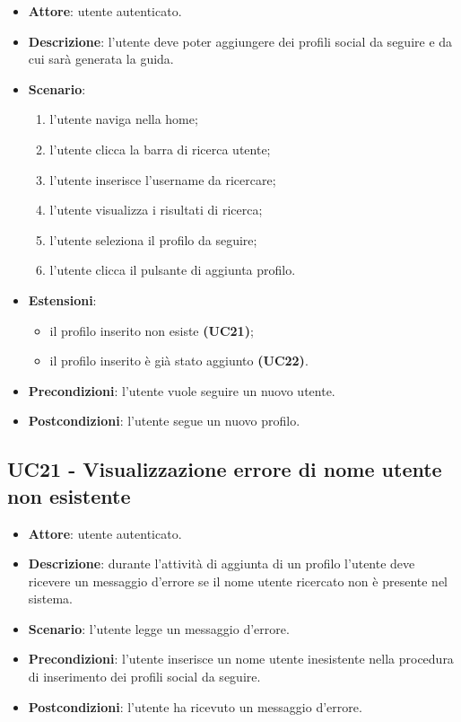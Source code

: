 \begin{itemize}
    \item \textbf{Attore}: utente autenticato.
    \item \textbf{Descrizione}: l'utente deve poter aggiungere dei profili social da seguire e da cui sarà generata la guida.
    \item \textbf{Scenario}:
    \begin{enumerate}
        \item l'utente naviga nella home;
        \item l'utente clicca la barra di ricerca utente;
        \item l'utente inserisce l'username da ricercare;
        \item l'utente visualizza i risultati di ricerca;
        \item l'utente seleziona il profilo da seguire;
        \item l'utente clicca il pulsante di aggiunta profilo.
    \end{enumerate}
    \item \textbf{Estensioni}:
    \begin{itemize}
    	\item il profilo inserito non esiste \textbf{(UC21)};
    	\item il profilo inserito è già stato aggiunto \textbf{(UC22)}.
    \end{itemize} 
    \item \textbf{Precondizioni}: l'utente vuole seguire un nuovo utente.
    \item \textbf{Postcondizioni}: l'utente segue un nuovo profilo.
\end{itemize}

\newpage

\subsection{UC21 - Visualizzazione errore di nome utente non esistente}
\begin{itemize}
    \item \textbf{Attore}: utente autenticato.
    \item \textbf{Descrizione}: durante l'attività di aggiunta di un profilo l'utente deve ricevere un messaggio d'errore se il nome utente ricercato non è presente nel sistema.
    \item \textbf{Scenario}: l'utente legge un messaggio d'errore. 
    \item \textbf{Precondizioni}: l'utente inserisce un nome utente inesistente nella procedura di inserimento dei profili social da seguire.
    \item \textbf{Postcondizioni}: l'utente ha ricevuto un messaggio d'errore.
\end{itemize}


